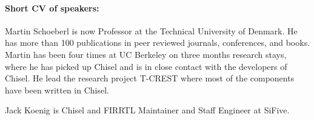 \documentclass{article}
\begin{document}
\paragraph{Short CV of speakers:}
Martin Schoeberl is now Professor at the Technical University of Denmark.
He has more than 100 publications in peer reviewed journals, conferences, and books.
Martin has been four times at UC Berkeley on three months research stays, where he has picked up Chisel
and is in close contact with the developers of Chisel.
He lead the research project T-CREST where most of the components have been written in Chisel.

Jack Koenig is Chisel and FIRRTL Maintainer and  Staff Engineer at SiFive.
\end{document}
